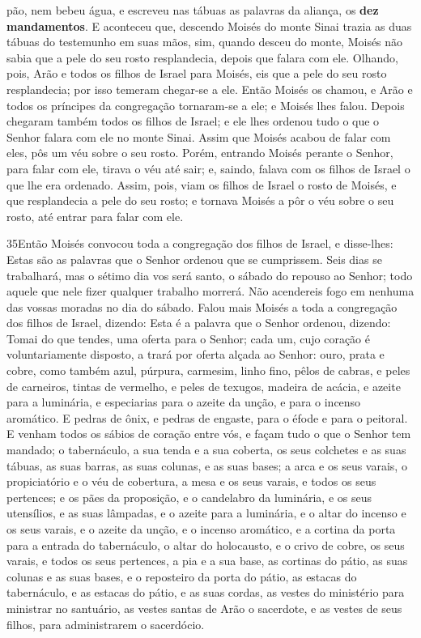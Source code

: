 pão, nem bebeu água, e escreveu nas tábuas as palavras da aliança,
os \textbf{dez mandamentos}. E aconteceu que, descendo Moisés
do monte Sinai trazia as duas tábuas do testemunho em suas mãos,
sim, quando desceu do monte, Moisés não sabia que a pele do seu
rosto resplandecia, depois que falara com ele. Olhando, pois,
Arão e todos os filhos de Israel para Moisés, eis que a pele do seu
rosto resplandecia; por isso temeram chegar-se a ele. Então
Moisés os chamou, e Arão e todos os príncipes da congregação
tornaram-se a ele; e Moisés lhes falou. Depois chegaram
também todos os filhos de Israel; e ele lhes ordenou tudo o que o
Senhor falara com ele no monte Sinai. Assim que Moisés acabou
de falar com eles, pôs um véu sobre o seu rosto. Porém,
entrando Moisés perante o Senhor, para falar com ele, tirava o véu
até sair; e, saindo, falava com os filhos de Israel o que lhe era
ordenado. Assim, pois, viam os filhos de Israel o rosto de
Moisés, e que resplandecia a pele do seu rosto; e tornava Moisés a
pôr o véu sobre o seu rosto, até entrar para falar com ele.

\medskip

\lettrine{35} Então Moisés convocou toda a congregação dos
filhos de Israel, e disse-lhes: Estas são as palavras que o Senhor
ordenou que se cumprissem. Seis dias se trabalhará, mas o sétimo
dia vos será santo, o sábado do repouso ao Senhor; todo aquele que
nele fizer qualquer trabalho morrerá. Não acendereis fogo em
nenhuma das vossas moradas no dia do sábado. Falou mais Moisés a
toda a congregação dos filhos de Israel, dizendo: Esta é a palavra
que o Senhor ordenou, dizendo: Tomai do que tendes, uma oferta
para o Senhor; cada um, cujo coração é voluntariamente disposto, a
trará por oferta alçada ao Senhor: ouro, prata e cobre, como
também azul, púrpura, carmesim, linho fino, pêlos de cabras, e
peles de carneiros, tintas de vermelho, e peles de texugos, madeira
de acácia, e azeite para a luminária, e especiarias para o
azeite da unção, e para o incenso aromático. E pedras de ônix, e
pedras de engaste, para o éfode e para o peitoral. E venham
todos os sábios de coração entre vós, e façam tudo o que o Senhor
tem mandado; o tabernáculo, a sua tenda e a sua coberta, os
seus colchetes e as suas tábuas, as suas barras, as suas colunas, e
as suas bases; a arca e os seus varais, o propiciatório e o
véu de cobertura, a mesa e os seus varais, e todos os seus
pertences; e os pães da proposição, e o candelabro da
luminária, e os seus utensílios, e as suas lâmpadas, e o azeite para
a luminária, e o altar do incenso e os seus varais, e o
azeite da unção, e o incenso aromático, e a cortina da porta para a
entrada do tabernáculo, o altar do holocausto, e o crivo de
cobre, os seus varais, e todos os seus pertences, a pia e a sua
base, as cortinas do pátio, as suas colunas e as suas bases,
e o reposteiro da porta do pátio, as estacas do tabernáculo,
e as estacas do pátio, e as suas cordas, as vestes do
ministério para ministrar no santuário, as vestes santas de Arão o
sacerdote, e as vestes de seus filhos, para administrarem o
sacerdócio.

